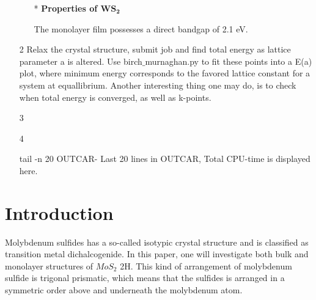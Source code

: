 \documentclass[twoside,onecolumn]{article}
\begin{document}
\begin{itemize}
\begin{itemize}
\bigskip

\item[*] {\bf{Properties of $\mathbf{WS_2}$}} 

\bigskip

The monolayer film possesses a direct bandgap of 2.1 eV.

\end{itemize}
\item[2]Relax the crystal structure, submit job and find total energy as lattice parameter a is altered. Use birch$\_$murnaghan.py to fit these points into a E(a) plot, where minimum energy corresponds to the favored lattice constant for a system at equallibrium. Another interesting thing one may do, is to check when total energy is converged, as well as k-points. 
 
\item[3]
\item[4]

tail -n 20 OUTCAR- Last 20 lines in OUTCAR, Total CPU-time is displayed here. 






\end{itemize}


\section{Introduction}

Molybdenum sulfides has a so-called isotypic crystal structure and is classified as transition metal dichalcogenide. In this paper, one will investigate both bulk and monolayer structures of $MoS_2$ 2H. This kind of arrangement of molybdenum sulfide is  trigonal prismatic, which means that the sulfides is arranged in a symmetric order above and underneath the molybdenum atom. 
\end{document}
